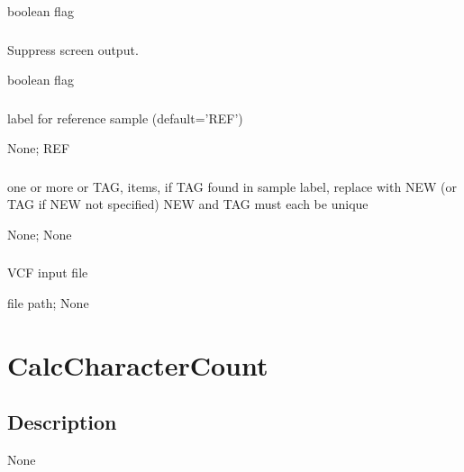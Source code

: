 \documentclass[letterpaper,11pt,english]{sphinxmanual}
\begin{document}
 boolean flag


\subsubsection{}
\label{\detokenize{prog_desc:id39}}
 Suppress screen output.

 boolean flag


\subsubsection{}
\label{\detokenize{prog_desc:id40}}
 label for reference sample (default=’REF’)

 None;  REF


\subsubsection{}
\label{\detokenize{prog_desc:id41}}
 one or more  or TAG, items, if TAG found in sample label, replace with NEW (or TAG if NEW not specified) NEW and TAG must each be unique

 None;  None


\subsubsection{}
\label{\detokenize{prog_desc:vcf}}
 VCF input file

 file path;  None


\section{CalcCharacterCount}
\label{\detokenize{prog_desc:calccharactercount}}

\subsection{Description}
\label{\detokenize{prog_desc:id42}}
None
\end{document}
